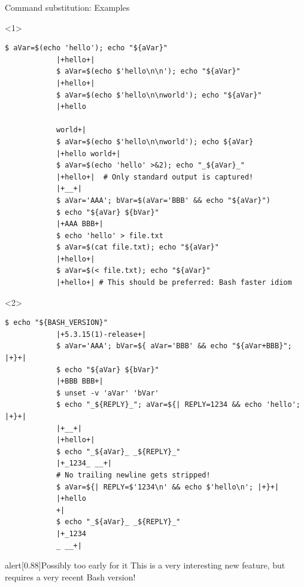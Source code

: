 \begin{frame}[fragile]{Command substitution: Examples}
    \begin{onlyenv}<1>
        \begin{lstlisting}[style=MyBash]
            $ aVar=$(echo 'hello'); echo "${aVar}"
            |+hello+|
            $ aVar=$(echo $'hello\n\n'); echo "${aVar}"
            |+hello+|
            $ aVar=$(echo $'hello\n\nworld'); echo "${aVar}"
            |+hello

            world+|
            $ aVar=$(echo $'hello\n\nworld'); echo ${aVar}
            |+hello world+|
            $ aVar=$(echo 'hello' >&2); echo "_${aVar}_"
            |+hello+|  # Only standard output is captured!
            |+__+|
            $ aVar='AAA'; bVar=$(aVar='BBB' && echo "${aVar}")
            $ echo "${aVar} ${bVar}"
            |+AAA BBB+|
            $ echo 'hello' > file.txt
            $ aVar=$(cat file.txt); echo "${aVar}"
            |+hello+|
            $ aVar=$(< file.txt); echo "${aVar}"
            |+hello+| # This should be preferred: Bash faster idiom
        \end{lstlisting}
    \end{onlyenv}
    \begin{onlyenv}<2>
        \begin{lstlisting}[style=MyBash, firstnumber=last]
            $ echo "${BASH_VERSION}"
            |+5.3.15(1)-release+|
            $ aVar='AAA'; bVar=${ aVar='BBB' && echo "${aVar+BBB}"; |+}+|
            $ echo "${aVar} ${bVar}"
            |+BBB BBB+|
            $ unset -v 'aVar' 'bVar'
            $ echo "_${REPLY}_"; aVar=${| REPLY=1234 && echo 'hello'; |+}+|
            |+__+|
            |+hello+|
            $ echo "_${aVar}_ _${REPLY}_"
            |+_1234_ __+|
            # No trailing newline gets stripped!
            $ aVar=${| REPLY=$'1234\n' && echo $'hello\n'; |+}+|
            |+hello
            +|
            $ echo "_${aVar}_ _${REPLY}_"
            |+_1234
            _ __+|
        \end{lstlisting}
        \begin{varblock}{alert}[0.88\textwidth]{Possibly too early for it}
            This is a very interesting new feature, but requires a very recent Bash version!
        \end{varblock}
    \end{onlyenv}
\end{frame}
